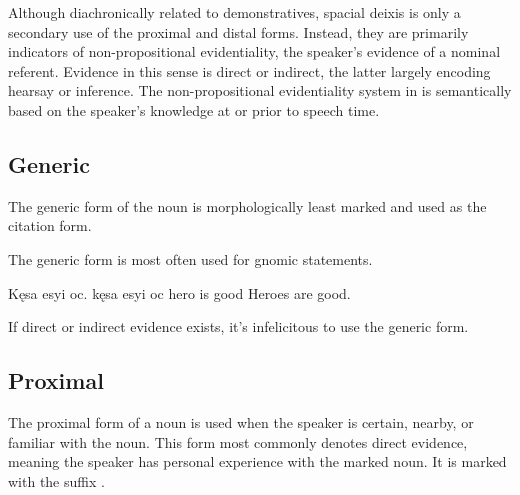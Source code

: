 Although diachronically related to demonstratives, spacial deixis is only a secondary use of the proximal and distal forms. Instead, they are primarily indicators of non-propositional evidentiality,  the speaker's evidence of a nominal referent. Evidence in this sense is direct or indirect, the latter largely encoding hearsay or inference. The non-propositional evidentiality system in \langname{} is semantically based on the speaker's knowledge at or prior to speech time. 

\subsection{Generic}
The generic form of the noun is morphologically least marked and used as the citation form.

The generic form is most often used for gnomic statements.

\begin{example}
    \script Kęsa esyi oc.
    \bits kęsa esyi oc
    \gloss hero is good
    \tr Heroes are good.
\end{example}



If direct or indirect evidence exists, it's infelicitous to use the generic form.

\subsection{Proximal}
The proximal form of a noun is used when the speaker is certain, nearby, or familiar with the noun.
This form most commonly denotes direct evidence, meaning the speaker has personal experience with the marked noun. It is marked with the suffix . 

